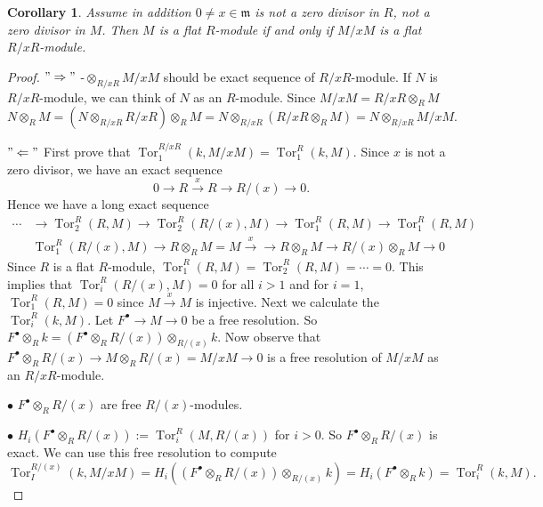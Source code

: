 \documentclass[cs4size]{article}
\newcommand{\frm}{\mathfrak{m}}
\newcommand{\ra}{\rightarrow}
\newcommand{\xr}{\xrightarrow}
\newcommand{\Ra}{\Rightarrow}
\DeclareMathOperator{\Tor}{Tor}
\newtheorem{cor}{Corollary}
\begin{document}
\begin{cor}
Assume in addition $0\neq x\in\frm$ is not a zero divisor in $R$, not a zero divisor in $M$. Then $M$ is a flat $R$-module if and only if $M/xM$ is a flat $R/xR$-module.
\end{cor}
\begin{proof}
$"\Ra"$ -$\otimes_{R/xR}M/xM$ should be exact sequence of $R/xR$-module. If $N$ is $R/xR$-module, we can think of $N$ as an $R$-module. Since $M/xM=R/xR\otimes_RM$ $N\otimes_RM=(N\otimes_{R/xR}R/xR)\otimes_RM
=N\otimes_{R/xR}(R/xR\otimes_RM)=N\otimes_{R/xR}M/xM.$

$"\Leftarrow"$ First prove that $\Tor_1^{R/xR}(k,M/xM)=\Tor_1^R(k,M)$. Since $x$ is not a zero divisor, we have an exact sequence
\[0\ra R\xr{x} R\ra R/(x)\ra 0.\]
Hence we have a long exact sequence
\begin{align*}
\cdots&\ra \Tor_2^R(R,M)\ra \Tor_2^R(R/(x),M)\ra \Tor_1^R(R,M)\ra\Tor_1^R(R,M)\\
&\Tor_1^R(R/(x),M)\ra R\otimes_RM=M\xr{x}\ra R\otimes_RM\ra R/(x)\otimes_RM\ra 0
\end{align*}
Since $R$ is a flat $R$-module, $\Tor_1^R(R,M)=\Tor_2^R(R,M)=\cdots=0$. This implies that $\Tor_i^R(R/(x),M)=0$ for all $i>1$ and for $i=1$, $\Tor_1^R(R,M)=0$ since $M\xr{x}M$ is injective. Next we calculate the $\Tor_i^R(k,M)$. Let $F^{\bullet}\ra M\ra 0$ be a free resolution. So $F^{\bullet}\otimes _Rk=(F^{\bullet}\otimes_RR/(x))\otimes_{R/(x)}k$. Now observe that $F^{\bullet}\otimes _RR/(x)\ra M\otimes_RR/(x)=M/xM\ra0$ is a free resolution of $M/xM$ as an $R/xR$-module.

$\bullet$ $F^{\bullet}\otimes_RR/(x)$ are free $R/(x)$-modules.

$\bullet$ $H_i(F^{\bullet}\otimes_RR/(x)):=\Tor_i^R(M,R/(x))$ for $i>0$. So $F^{\bullet}\otimes_RR/(x)$ is exact. We can use this free resolution to compute
\[\Tor_I^{R/(x)}(k,M/xM)=H_i((F^{\bullet}\otimes_RR/(x))\otimes_{R/(x)}k)
=H_i(F^{\bullet}\otimes_Rk)=\Tor_i^R(k,M).\]
\end{proof}
\end{document}
